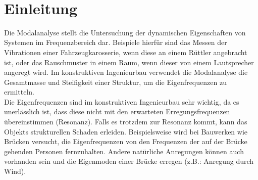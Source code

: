 \documentclass[a4paper,10pt,twoside]{article}
\numberwithin{equation}{section} %
\numberwithin{figure}{section}   %
\numberwithin{table}{section}    %
\begin{document}
	\tableofcontents
	
	\newpage
	\pagestyle{empty}
	\ \\
	\newpage	
	
	
	

	
	\pagestyle{fancy}
	\fancyhead[RO,LE]{\nouppercase\leftmark} %

	
	\setcounter{page}{1} 
	
	\section{Einleitung}\label{sec:einleitung}
	
	Die Modalanalyse stellt die Untersuchung der dynamischen Eigenschaften von Systemen im Frequenzbereich dar. Beispiele hierfür sind das Messen der Vibrationen einer Fahrzeugkarosserie, wenn diese an einem Rüttler angebracht ist, oder das Rauschmuster in einem Raum, wenn dieser von einem Lautsprecher angeregt wird. Im konstruktiven Ingenieurbau verwendet die Modalanalyse die Gesamtmasse und Steifigkeit einer Struktur, um die Eigenfrequenzen zu ermitteln. \\
	
	Die Eigenfrequenzen sind im konstruktiven Ingenieurbau sehr wichtig, da es unerlässlich ist, dass diese nicht mit den erwarteten Erregungsfrequenzen übereinstimmen (Resonanz). Falls es trotzdem zur Resonanz kommt, kann das Objekts strukturellen Schaden erleiden. Beispielsweise wird bei Bauwerken wie Brücken versucht, die Eigenfrequenzen von den Frequenzen der auf der Brücke gehenden Personen fernzuhalten. Andere natürliche Anregungen können auch vorhanden sein und die Eigenmoden einer Brücke erregen (z.B.: Anregung durch Wind).\\
	
\end{document}
